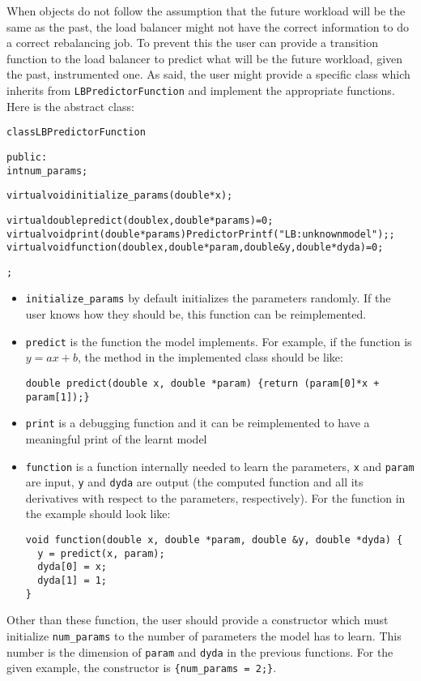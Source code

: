 When objects do not follow the assumption that the future workload will be the
same as the past, the load balancer might not have the correct information to do
a correct rebalancing job. To prevent this the user can provide a transition
function to the load balancer to predict what will be the future workload, given
the past, instrumented one. As said, the user might provide a specific class
which inherits from {\tt LBPredictorFunction} and implement the appropriate functions. 
Here is the abstract class:
\begin{alltt}
class LBPredictorFunction {
public:
  int num_params;
 
  virtual void initialize_params(double *x);

  virtual double predict(double x, double *params) =0;
  virtual void print(double *params) {PredictorPrintf("LB: unknown model");};
  virtual void function(double x, double *param, double &y, double *dyda) =0;
};
\end{alltt}
\begin{itemize}
\item {\tt initialize\_params} by default initializes the parameters randomly. If the user
knows how they should be, this function can be reimplemented.
\item {\tt predict} is the function the model implements. For example, if the function is
$y=ax+b$, the method in the implemented class should be like:
\begin{verbatim}
double predict(double x, double *param) {return (param[0]*x + param[1]);}
\end{verbatim}
\item {\tt print} is a debugging function and it can be reimplemented to have a meaningful
print of the learnt model
\item {\tt function} is a function internally needed to learn the parameters, {\tt x} and
{\tt param} are input, {\tt y} and {\tt dyda} are output (the computed function and
all its derivatives with respect to the parameters, respectively).
For the function in the example should look like:
\begin{verbatim}
void function(double x, double *param, double &y, double *dyda) {
  y = predict(x, param);
  dyda[0] = x;
  dyda[1] = 1;
}
\end{verbatim}
\end{itemize}
Other than these function, the user should provide a constructor which must initialize
{\tt num\_params} to the number of parameters the model has to learn. This number is
the dimension of {\tt param} and {\tt dyda} in the previous functions. For the given
example, the constructor is {\tt \{num\_params = 2;\}}.

